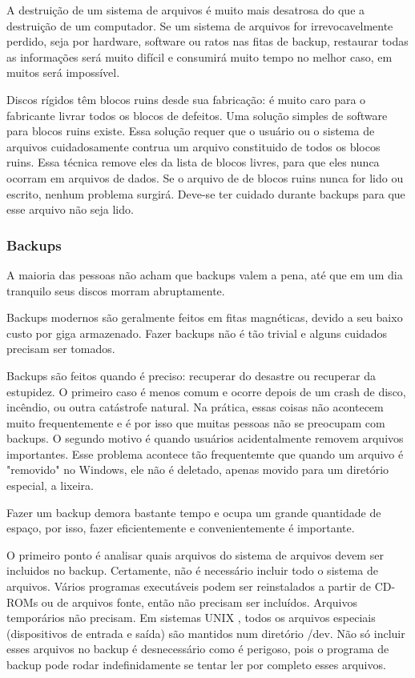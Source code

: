 \documentclass{article}
\newcommand\unix{{\color{red}UNIX} }
\begin{document}
A destruição de um sistema de arquivos é muito mais desatrosa do que a destruição de um computador. Se um sistema de arquivos for irrevocavelmente perdido, seja por hardware, software ou ratos nas fitas de backup, restaurar todas as informações será muito difícil e consumirá muito tempo no melhor caso, em muitos será impossível.

Discos rígidos têm blocos ruins desde sua fabricação: é muito caro para o fabricante livrar todos os blocos de defeitos. Uma solução simples de software para blocos ruins existe. Essa solução requer que o usuário ou o sistema de arquivos cuidadosamente contrua um arquivo constituido de todos os blocos ruins. Essa técnica remove eles da lista de blocos livres, para que eles nunca ocorram em arquivos de dados. Se o arquivo de de blocos ruins nunca for lido ou escrito, nenhum problema surgirá. Deve-se ter cuidado durante backups para que esse arquivo não seja lido.

\subsubsection{Backups}

A maioria das pessoas não acham que backups valem a pena, até que em um dia tranquilo seus discos morram abruptamente. 

Backups modernos são geralmente feitos em fitas magnéticas, devido a seu baixo custo por giga armazenado. Fazer backups não é tão trivial e alguns cuidados precisam ser tomados.  

Backups são feitos quando é preciso: recuperar do desastre ou recuperar da estupidez. O primeiro caso é menos comum e ocorre depois de um crash de disco, incêndio, ou outra catástrofe natural. Na prática, essas coisas não acontecem muito frequentemente e é por isso que muitas pessoas não se preocupam com backups. O segundo motivo é quando usuários acidentalmente removem arquivos importantes. Esse problema acontece tão frequentemte que quando um arquivo é "removido" no Windows, ele não é deletado, apenas movido para um diretório especial, a lixeira.

Fazer um backup demora bastante tempo e ocupa um grande quantidade de espaço, por isso, fazer eficientemente e convenientemente é importante.

O primeiro ponto é analisar quais arquivos do sistema de arquivos devem ser incluidos no backup. Certamente, não é necessário incluir todo o sistema de arquivos. Vários programas executáveis podem ser reinstalados a partir de CD-ROMs ou de arquivos fonte, então não precisam ser incluídos. Arquivos temporários não precisam. Em sistemas \unix, todos os arquivos especiais (dispositivos de entrada e saída) são mantidos num diretório /dev. Não só incluir esses arquivos no backup é desnecessário como é perigoso, pois o programa de backup pode rodar indefinidamente se tentar ler por completo esses arquivos. 
\end{document}
